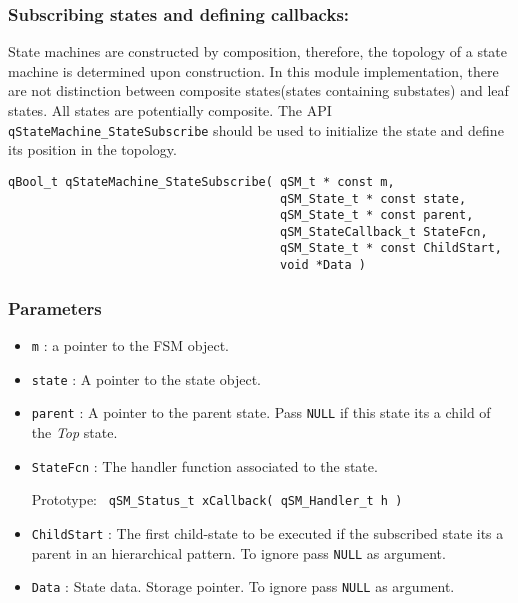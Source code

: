 \subsubsection{Subscribing states and defining callbacks: }
State  machines  are constructed by composition, therefore, the topology of a state machine is determined upon construction.
In this module implementation, there are not distinction between composite states(states containing substates) and leaf states. All states are potentially composite. 
The API \lstinline{qStateMachine_StateSubscribe} should be used to initialize the state and define its position in the topology.
\medskip

\begin{lstlisting}[style=CStyle]
qBool_t qStateMachine_StateSubscribe( qSM_t * const m, 
                                      qSM_State_t * const state, 
                                      qSM_State_t * const parent, 
                                      qSM_StateCallback_t StateFcn, 
                                      qSM_State_t * const ChildStart, 
                                      void *Data )
\end{lstlisting}

\subsubsection*{Parameters}
\begin{itemize}
    \item \lstinline{m} : a pointer to the FSM object.
    \item \lstinline{state} :  A pointer to the state object.
    \item \lstinline{parent} : A pointer to the parent state. Pass \lstinline{NULL} if this state its a child of the \textit{Top} state.
    \item \lstinline{StateFcn} : The handler function associated to the state. 

                                 Prototype: \lstinline{ qSM_Status_t xCallback( qSM_Handler_t h ) }
    \item \lstinline{ChildStart} : The first child-state to be executed if the subscribed state its a parent in an hierarchical pattern. To ignore pass \lstinline{NULL} as argument.
    \item \lstinline{Data} : State data. Storage pointer. To ignore pass \lstinline{NULL} as argument.
\end{itemize}  

